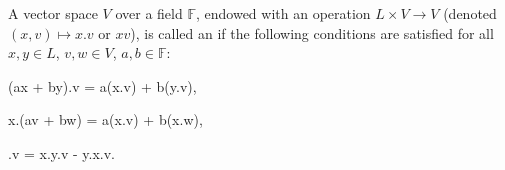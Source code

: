 A vector space $V$ over a field $\mathbb{F}$, endowed with an operation $L \times V \rightarrow V$ (denoted $(x, v) \mapsto x.v$ or $xv$), is called an  if the following conditions are satisfied for all $x, y \in L$, $v, w \in V$, $a, b \in \mathbb{F}$:

 \quad (ax + by).v = a(x.v) + b(y.v),

 \quad x.(av + bw) = a(x.v) + b(x.w),

 \quad [xy].v = x.y.v - y.x.v.
